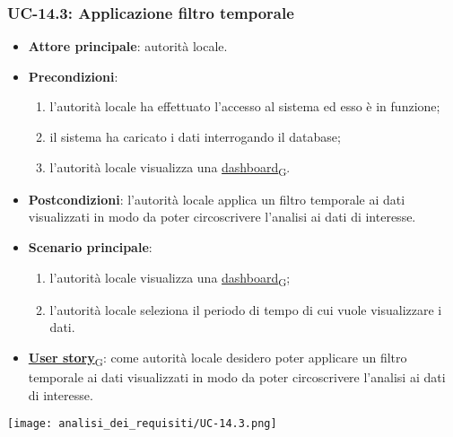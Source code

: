 \subsubsection{UC-14.3: Applicazione filtro temporale}
\begin{itemize}
	\item \textbf{Attore principale}: autorità locale.
	\item \textbf{Precondizioni}:
	      \begin{enumerate}
		      \item l'autorità locale ha effettuato l'accesso al sistema ed esso è in funzione;
		      \item il sistema ha caricato i dati interrogando il database;
		      \item l'autorità locale visualizza una \href{https://7last.github.io/docs/pb/documentazione-interna/glossario\#dashboard}{dashboard\textsubscript{G}}.
	      \end{enumerate}
	\item \textbf{Postcondizioni}: l'autorità locale applica un filtro temporale ai dati visualizzati in modo da poter circoscrivere l'analisi ai dati di interesse.
	\item \textbf{Scenario principale}:
	      \begin{enumerate}
		      \item l'autorità locale visualizza una \href{https://7last.github.io/docs/pb/documentazione-interna/glossario\#dashboard}{dashboard\textsubscript{G}};
		      \item l'autorità locale seleziona il periodo di tempo di cui vuole visualizzare i dati.
	      \end{enumerate}
	\item \href{https://7last.github.io/docs/pb/documentazione-interna/glossario\#user-story}{\textbf{User story}\textsubscript{G}}:
	      come autorità locale desidero poter applicare un filtro temporale ai dati visualizzati in modo da poter circoscrivere l'analisi ai dati di interesse.
\end{itemize}
\begin{center}
	\texttt{[image: analisi\_dei\_requisiti/UC-14.3.png]}
\end{center}

